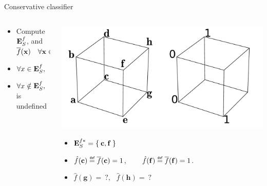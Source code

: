 \documentclass{beamer}
\begin{document}
\begin{frame}{Conservative classifier\cite{StrYvoREPORT05}}
  \begin{columns}
    \begin{column}{0.5\textwidth}
      \begin{itemize}
        \item Compute $\mathbf{E}_{S}^{f}$, and $\overline{f}(\mathbf{x}) ~~~ \forall \mathbf{x} \in \mathbf{E}_{S}^{f}$
        \item $\forall x \in\esf, ~~ \hat{f}(\mathbf{x}) \eqdef \albl{\mathbf{x}}$
        \item $\forall x \notin \mathbf{E}_{S}^{f}, ~~ \hat{f}(\mathbf{x})$ is undefined
      \end{itemize}
    \end{column}
    \begin{column}{0.5\textwidth}
      \begin{center}
        \includegraphics[width=.9\textwidth]{figures/ae_example.pdf}
      \end{center}
      \begin{itemize}
      \item $\mathbf{E}_{S}^{f*} = \Set{\mathbf{c}, \mathbf{f}}$
      \item $\hat{f}(\mathbf{c}) \eqdef \albl{\mathbf{c}} = 1$, ~~~
        $\hat{f}(\mathbf{f}) \eqdef \albl{\mathbf{f}} = 1$.
      \item $\hat{f}(\mathbf{g}) =~?, ~~~ \hat{f}(\mathbf{h}) =~?$
      \end{itemize}
    \end{column}
  \end{columns}
\end{frame}
\end{document}
